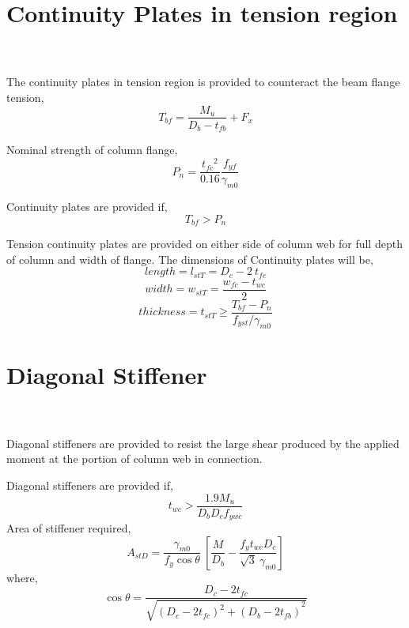 \documentclass[11.5pt,a4paper,oneside]{report}
\begin{document}
\begin{Form}
\section{Continuity Plates in tension region}
\qquad {} \\ \\
\noindent
The continuity plates in tension region is provided to counteract the beam flange tension, 
\begin{equation}
T_{bf} = \frac{M_u}{D_b - t_{fb}} + F_x
\end{equation}

\noindent
Nominal strength of column flange, 
\begin{equation}
P_n = \frac{{t_{fc}}^2}{0.16} \frac{f_{yf}}{\gamma_{m0}}	
\end{equation}

\noindent
Continuity plates are provided if,
\begin{equation}
T_{bf} >  P_n
\end{equation}

\noindent
Tension continuity plates are provided on either side of column web for full depth of column and width of flange.
The dimensions of Continuity plates will be, \\
\begin{equation}
length = l_{stT} = D_c-2~t_{fc}
\end{equation}
\begin{equation}
width = w_{stT} = \frac{w_{fc}-t_{wc}}{2}
\end{equation}
\begin{equation}
thickness = t_{stT} \ge \frac{T_{bf}-P_n}{f_{yst}/\gamma_{m0}}
\end{equation}


\pagebreak
\section{Diagonal Stiffener}
\qquad {} \\ \\
\noindent
Diagonal stiffeners are provided to resist the large shear produced by the applied moment at the portion of column web in connection. 

\noindent
Diagonal stiffeners are provided if,
\begin{equation}
t_{wc} > \frac{1.9 M_u}{D_b D_c f_{ywc}}
\end{equation}
\noindent
Area of stiffener required, 
\begin{equation}
A_{stD} = 
\frac{\gamma_{m0}}{f_y \cos{\theta}} ~ [
\frac{M}{D_b} - 
\frac{f_y t_{wc} D_c}{\sqrt{3} ~ \gamma_{m0}} ]
\end{equation}
where,
\begin{equation}
\cos{\theta} = \frac{D_c - 2 t_{fc}}
{\sqrt{{{(D_c - 2 t_{fc})}^2 + (D_b - 2 t_{fb})}^2}}
\end{equation}




\end{Form}
\end{document}
